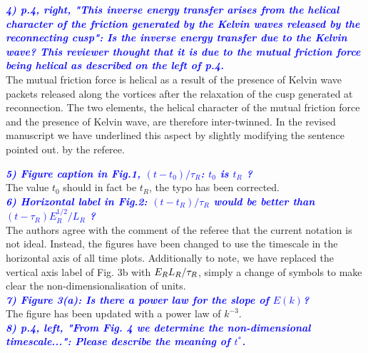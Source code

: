 \documentclass[a4paper,10pt]{article}
\def\red#1{\textcolor{black}{#1}}
\def\blue#1{\textcolor{blue}{#1}}
\def\refcomment#1{\textbf{\blue{\emph{#1}}}\\}
\begin{document}
    \refcomment{4) p.4, right, "This inverse energy transfer arises from the helical
    character of the friction generated by the Kelvin waves released by
    the reconnecting cusp": Is the inverse energy transfer due to the
    Kelvin wave? This reviewer thought that it is due to the mutual
    friction force being helical as described on the left of p.4.}

    The mutual friction force is helical as a result of the presence of Kelvin wave packets released along the vortices after the relaxation of the cusp generated at reconnection. The two elements, the helical character 
of the mutual friction force and the presence of Kelvin wave, are 
therefore inter-twinned. In the revised manuscript we have 
underlined this aspect  by slightly modifying the sentence pointed out.
by the referee.  
  
    \refcomment{5) Figure caption in Fig.1, $(t - t_0)/\tau_R$: $t_0$ is $t_R$ ?}

    The value $t_0$ should in fact be $t_R$, the typo has been corrected.\\
    
    \refcomment{6) Horizontal label in Fig.2: $(t - t_R)/\tau_R$ would be better than $(t- \tau_R)E_R^{1/2}/L_R$ ?}

    The authors agree with the comment of the referee that the current notation is not ideal. Instead, the figures have been changed to use the timescale in the horizontal axis of all time plots. Additionally to note, we have replaced the vertical axis label of Fig. 3b with $E_R \red{L_R}/\tau_R$, simply a change of symbols to make clear the non-dimensionalisation of units.\\
    
    \refcomment{7) Figure 3(a): Is there a power law for the slope of $E(k)$?}

    The figure has been updated with a power law of $k^{-3}$.\\
    
    \refcomment{8) p.4, left, "From Fig. 4 we determine the non-dimensional
    timescale...": Please describe the meaning of $t^*$.}
\end{document}
